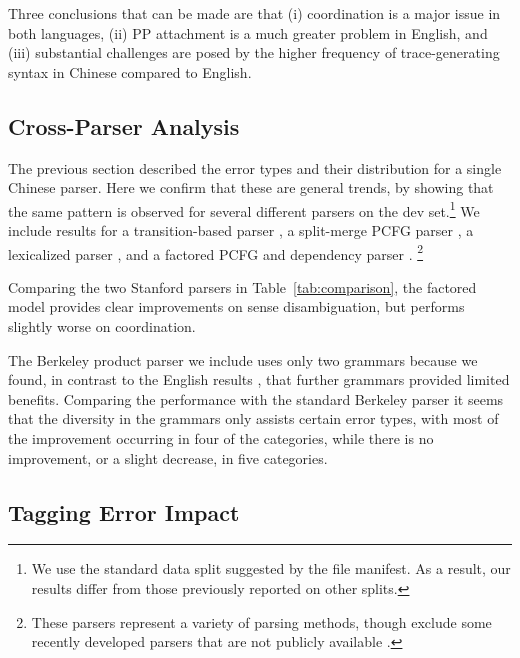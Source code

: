 Three conclusions that can be made are that (i) coordination is a major issue in
both languages, (ii) PP attachment is a much greater problem in English, and
(iii) substantial challenges are posed by the higher frequency of trace-generating
syntax in Chinese compared to English.

\subsection{Cross-Parser Analysis} \label{sec:cross_parser_analysis}
The previous section described the error types and their distribution for a single Chinese parser.
Here we confirm that these are general trends, by showing that the same pattern
is observed for several different parsers on the  dev set.\footnote{
  We use the standard data split suggested by the  file manifest.
  As a result, our results differ from those previously reported on other splits.
}
We include results for
a transition-based parser \parencite[ZPAR;][]{Zhang-Clark:2009:ICPT},
a split-merge PCFG parser \parencite{Petrov-etal:2006,Petrov-Klein:2007,Petrov:2010:NAACLHLT},
a lexicalized parser \parencite{Bikel-Chiang:2000:CLP},
and a factored PCFG and dependency parser
\parencite{Levy-Manning:2003:ACL,Klein-Manning:2003:ACL,Klein-Manning:2003:NIPS}.
\footnote{These parsers represent a variety of parsing methods, though exclude
some recently developed parsers that are not publicly
available \parencite{Qian-Liu:2012:EMNLP,Xiong-etal:2005:IJCNLP}.}

Comparing the two Stanford parsers in Table~\ref{tab:comparison}, the factored
model provides clear improvements on sense disambiguation, but performs
slightly worse on coordination.

The Berkeley product parser we include uses only two grammars because we found,
in contrast to the English results \parencite{Petrov:2010:NAACLHLT}, that further
grammars provided limited benefits.  Comparing the performance with the
standard Berkeley parser it seems that the diversity in the grammars only
assists certain error types, with most of the improvement occurring in four of
the categories, while there is no improvement, or a slight decrease, in five categories.

\subsection{Tagging Error Impact} \label{sec:pos_ablation_study}


